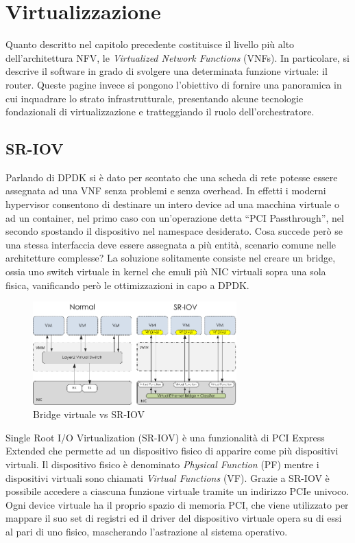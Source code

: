 \chapter{Virtualizzazione}
\label{chap:virt}

Quanto descritto nel capitolo precedente costituisce il livello più alto dell'architettura NFV, le \textit{Virtualized Network Functions} (VNFs). In particolare, si descrive il software in grado di svolgere una determinata funzione virtuale: il router. Queste pagine invece si pongono l'obiettivo di fornire una panoramica in cui inquadrare lo strato infrastrutturale, presentando alcune tecnologie fondazionali di virtualizzazione e tratteggiando il ruolo dell'orchestratore.

\section{SR-IOV}

Parlando di DPDK si è dato per scontato che una scheda di rete potesse essere assegnata ad una VNF senza problemi e senza overhead. In effetti i moderni hypervisor consentono di destinare un intero device ad una macchina virtuale o ad un container, nel primo caso con un'operazione detta ``PCI Passthrough'', nel secondo spostando il dispositivo nel namespace desiderato. Cosa succede però se una stessa interfaccia deve essere assegnata a più entità, scenario comune nelle architetture complesse? La soluzione solitamente consiste nel creare un bridge, ossia uno switch virtuale in kernel che emuli più NIC virtuali sopra una sola fisica, vanificando però le ottimizzazioni in capo a DPDK.

\begin{figure}[htb]
    \includegraphics[width=0.7\textwidth]{graphics/sriov_overview.png}
    \caption{Bridge virtuale vs SR-IOV}
    \label{fig:sriov-overview}
\end{figure}

Single Root I/O Virtualization (SR-IOV) è una funzionalità di PCI Express Extended che permette ad un dispositivo fisico di apparire come più dispositivi virtuali. Il dispositivo fisico è denominato \textit{Physical Function} (PF) mentre i dispositivi virtuali sono chiamati \textit{Virtual Functions} (VF). Grazie a SR-IOV è possibile accedere a ciascuna funzione virtuale tramite un indirizzo PCIe univoco. Ogni device virtuale ha il proprio spazio di memoria PCI, che viene utilizzato per mappare il suo set di registri ed il driver del dispositivo virtuale opera su di essi al pari di uno fisico, mascherando l'astrazione al sistema operativo.

